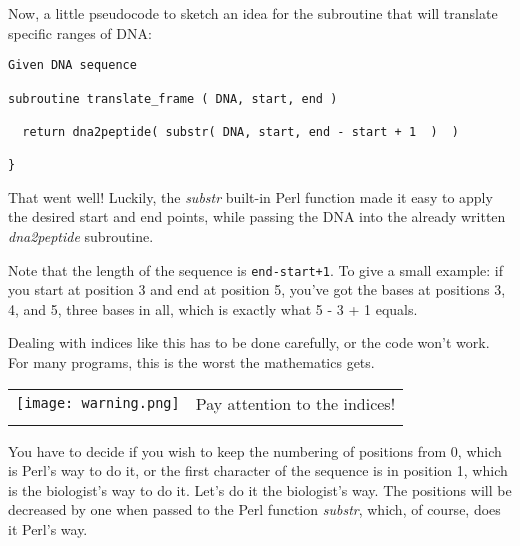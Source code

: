 Now, a little pseudocode to sketch an idea for the subroutine that will translate specific ranges of DNA: 

\begin{lstlisting}
Given DNA sequence

subroutine translate_frame ( DNA, start, end )

  return dna2peptide( substr( DNA, start, end - start + 1  )  )

}
\end{lstlisting}

That went well! Luckily, the \textit{substr} built-in Perl function made it easy to apply the desired start and end points, while passing the DNA into the already written \textit{dna2peptide} subroutine.

Note that the length of the sequence is \verb|end-start+1|. To give a small example: if you start at position 3 and end at position 5, you've got the bases at positions 3, 4, and 5, three bases in all, which is exactly what 5 - 3 + 1 equals.

Dealing with indices like this has to be done carefully, or the code won't work. For many programs, this is the worst the mathematics gets. 


\vspace{-5pt}
\begin{table}[h]
  \begin{center}
    \begin{tabu} to 0.85\linewidth {|X[1,r,m]X[15,l,m]|}
      \tabucline{-}
      \texttt{[image: warning.png]} & Pay attention to the indices!\\
      \tabucline{-}
    \end{tabu}
  \end{center}
\end{table}
\vspace{-20pt}

You have to decide if you wish to keep the numbering of positions from 0, which is Perl's way to do it, or the first character of the sequence is in position 1, which is the biologist's way to do it. Let's do it the biologist's way. The positions will be decreased by one when passed to the Perl function \textit{substr}, which, of course, does it Perl's way.

